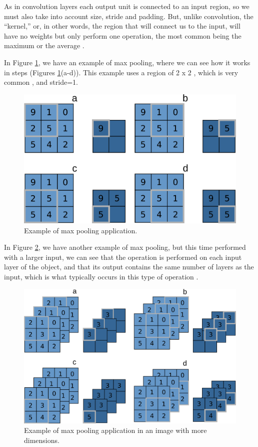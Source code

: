 As in convolution layers each output unit is connected to an input region, so we must also take into account size, stride and padding. But, unlike convolution, the “kernel,” or, in other words, the region that will connect us to the input, will have no weights but only perform one operation, the most common being the maximum or the average \cite{geron2019} .

In Figure \ref{fig:figure121}, we have an example of max pooling, where we can see how it works in steps (Figures \ref{fig:figure121}(a-d)). This example uses a region of 2 x 2 , which is very common \cite{adrian2017}, and stride=1.

\begin{figure}
    \centering
    \includegraphics[scale=0.30]{images/figure121.png}
    \caption{Example of max pooling application.}
    \label{fig:figure121}
\end{figure}

In Figure \ref{fig:figure122}, we have another example of max pooling, but this time performed with a larger input, we can see that the operation is performed on each input layer of the object, and that its output contains the same number of layers as the input, which is what typically occurs in this type of operation \cite{geron2019}.

\begin{figure}
    \centering
    \includegraphics[scale=0.30]{images/figure122.png}
    \caption{Example of max pooling application in an image with more dimensions.}
    \label{fig:figure122}
\end{figure}

